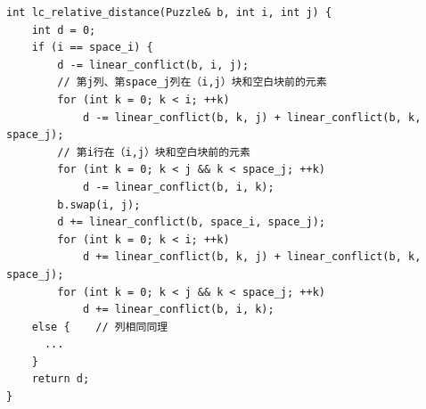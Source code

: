 \documentclass[10pt,letterpaper]{ctexart}
\begin{document}
\begin{enumerate}[itemindent=2.5em,label=\arabic*、]
\begin{figure}[H]%
\centering
{}
\end{figure}

\begin{lstlisting}[caption=线性冲突相对距离,label={code:lc-r},captionpos=b]
int lc_relative_distance(Puzzle& b, int i, int j) {
    int d = 0;
    if (i == space_i) {
        d -= linear_conflict(b, i, j);
        // 第j列、第space_j列在（i,j）块和空白块前的元素
        for (int k = 0; k < i; ++k)
            d -= linear_conflict(b, k, j) + linear_conflict(b, k, space_j);
        // 第i行在（i,j）块和空白块前的元素
        for (int k = 0; k < j && k < space_j; ++k)
            d -= linear_conflict(b, i, k);
        b.swap(i, j);
        d += linear_conflict(b, space_i, space_j);
        for (int k = 0; k < i; ++k)
            d += linear_conflict(b, k, j) + linear_conflict(b, k, space_j);
        for (int k = 0; k < j && k < space_j; ++k)
            d += linear_conflict(b, i, k);
    else {    // 列相同同理
      ...
    }
    return d;
}
\end{lstlisting}
\end{enumerate}

\newpage
\end{document}

